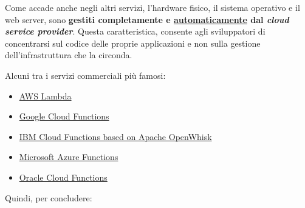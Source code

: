 \documentclass[a4paper]{article}
\begin{document}
	\noindent
	Come accade anche negli altri servizi, l'hardware fisico, il sistema operativo e il web server, sono \textbf{gestiti completamente e \underline{automaticamente} dal \emph{cloud service provider}}. Questa caratteristica, consente agli sviluppatori di concentrarsi sul codice delle proprie applicazioni e non sulla gestione dell'infrastruttura che la circonda.\newline
	
	\noindent
	Alcuni tra i servizi commerciali più famosi:
	\begin{itemize}
		\item \href{https://aws.amazon.com/it/lambda/}{AWS Lambda}
		
		\item \href{https://cloud.google.com/functions?hl=it}{Google Cloud Functions}
		
		\item \href{https://www.ibm.com/it-it/cloud/functions}{IBM Cloud Functions based on Apache OpenWhisk}
		
		\item \href{https://azure.microsoft.com/it-it/products/functions/?ef_id=_k_064f86cb83d914979a22e2a5f86f67bb_k_&OCID=AIDcmmy6frl1tq_SEM__k_064f86cb83d914979a22e2a5f86f67bb_k_&msclkid=064f86cb83d914979a22e2a5f86f67bb}{Microsoft Azure Functions}
		
		\item \href{https://www.oracle.com/cloud/cloud-native/functions/}{Oracle Cloud Functions}
	\end{itemize}
	Quindi, per concludere:
\end{document}
